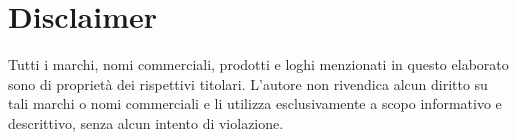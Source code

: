 \chapter*{Disclaimer}

Tutti i marchi, nomi commerciali, prodotti e loghi menzionati in questo elaborato sono di proprietà dei rispettivi titolari.
L'autore non rivendica alcun diritto su tali marchi o nomi commerciali e li utilizza esclusivamente a scopo informativo e descrittivo, senza alcun intento di violazione.
